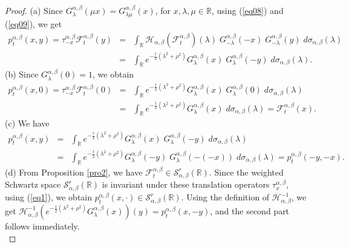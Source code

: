 \documentclass[10pt,a4paper]{amsart}
\def \H{{\mathcal H}}
\def \R{{\mathbb R}}
\def \S{{\mathcal S}}
\begin{document}
\begin{proof}
(a) Since $G^{\alpha, \beta}_{\lambda}(\mu x)=G^{\alpha, \beta}_{\lambda \mu}(x)$, for $x, \lambda, \mu \in \R$, using (\ref{eq08}) and (\ref{eq09}), we get
\begin{eqnarray*}
p_t^{\alpha, \beta}(x, y) =  \tau^{\alpha, \beta}_{-x} \mathcal{F}_t^{\alpha, \beta}(y)
& = & \int_{\mathbb{R}} \H_{\alpha, \beta} \left(\mathcal{F}_t^{\alpha, \beta} \right) (\lambda) \; G^{\alpha, \beta}_{-\lambda}(-x) \; G^{\alpha, \beta}_{-\lambda}(y) \;  d\sigma_{\alpha, \beta}(\lambda) \\
& = & \int_{\mathbb{R}} e^{-\frac{t}{2}\left( \lambda^2+\rho^2\right)}  G^{\alpha, \beta}_{\lambda}(x) \; G^{\alpha, \beta}_{\lambda}(-y) \;  d\sigma_{\alpha, \beta}(\lambda).
\end{eqnarray*}
(b) Since $G^{\alpha, \beta}_\lambda(0)=1$, we obtain
\begin{eqnarray*}
p_t^{\alpha, \beta}(x, 0) =  \tau^{\alpha, \beta}_{-x} \mathcal{F}_t^{\alpha, \beta}(0)
& = & \int_{\mathbb{R}} e^{-\frac{t}{2}\left( \lambda^2+\rho^2\right)}  G^{\alpha, \beta}_{\lambda}(x) \; G^{\alpha, \beta}_{\lambda}(0) \;  d\sigma_{\alpha, \beta}(\lambda) \\
& = & \int_{\mathbb{R}} e^{-\frac{t}{2}\left( \lambda^2+\rho^2\right)}  G^{\alpha, \beta}_{\lambda}(x) \;  d\sigma_{\alpha, \beta}(\lambda) 
= \mathcal{F}_t^{\alpha, \beta}(x).
\end{eqnarray*}
(c) We have
\begin{eqnarray*}
p_t^{\alpha, \beta}(x, y) 
& = & \int_{\mathbb{R}} e^{-\frac{t}{2}\left( \lambda^2+\rho^2\right)}  G^{\alpha, \beta}_{\lambda}(x) \; G^{\alpha, \beta}_{\lambda}(-y) \;  d\sigma_{\alpha, \beta}(\lambda) \\
& = & \int_{\mathbb{R}} e^{-\frac{t}{2}\left( \lambda^2+\rho^2\right)}  G^{\alpha, \beta}_{\lambda}(-y) \;G^{\alpha, \beta}_{\lambda}(-(-x)) \;    d\sigma_{\alpha, \beta}(\lambda)
= p_t^{\alpha, \beta}(-y, -x).
\end{eqnarray*}
(d) From Proposition \ref{pro2}, we have $\mathcal{F}_t^{\alpha, \beta} \in \S^r_{\alpha, \beta} (\mathbb{R})$. Since the weighted Schwartz space $\S^r_{\alpha, \beta} (\mathbb{R})$ is invariant under these translation operators $\tau^{\alpha, \beta}_{x}$, using (\ref{eq1}), we obtain $p_t^{\alpha, \beta}(x, \cdot) \in \S^r_{\alpha, \beta} (\mathbb{R})$. Using the definition of $\H^{-1}_{\alpha, \beta}$, we get $\H^{-1}_{\alpha, \beta} \left( e^{-\frac{t}{2}\left( \lambda^2+\rho^2\right)} G^{\alpha, \beta}_\lambda(x) \right) (y)= p_t^{\alpha, \beta}(x, -y)$, and the second part follows immediately.\\

\end{proof}
\end{document}
